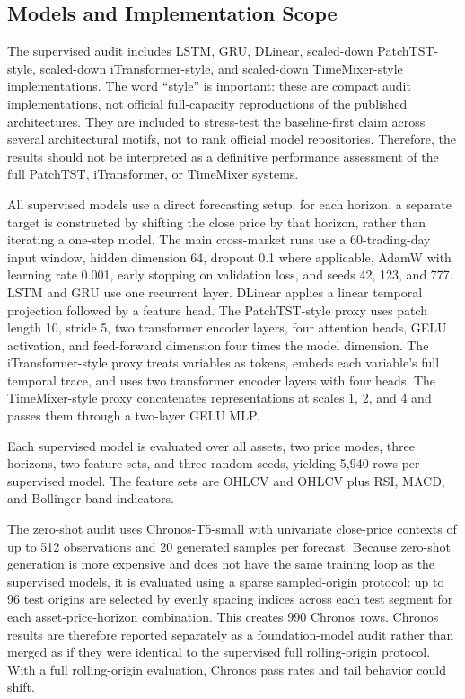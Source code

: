 \documentclass[11pt]{article}
\begin{document}
\subsection{Models and Implementation Scope}

The supervised audit includes LSTM, GRU, DLinear, scaled-down PatchTST-style, scaled-down iTransformer-style, and scaled-down TimeMixer-style implementations. The word ``style'' is important: these are compact audit implementations, not official full-capacity reproductions of the published architectures. They are included to stress-test the baseline-first claim across several architectural motifs, not to rank official model repositories. Therefore, the results should not be interpreted as a definitive performance assessment of the full PatchTST, iTransformer, or TimeMixer systems.

All supervised models use a direct forecasting setup: for each horizon, a separate target is constructed by shifting the close price by that horizon, rather than iterating a one-step model. The main cross-market runs use a 60-trading-day input window, hidden dimension 64, dropout 0.1 where applicable, AdamW with learning rate 0.001, early stopping on validation loss, and seeds 42, 123, and 777. LSTM and GRU use one recurrent layer. DLinear applies a linear temporal projection followed by a feature head. The PatchTST-style proxy uses patch length 10, stride 5, two transformer encoder layers, four attention heads, GELU activation, and feed-forward dimension four times the model dimension. The iTransformer-style proxy treats variables as tokens, embeds each variable's full temporal trace, and uses two transformer encoder layers with four heads. The TimeMixer-style proxy concatenates representations at scales 1, 2, and 4 and passes them through a two-layer GELU MLP.

Each supervised model is evaluated over all assets, two price modes, three horizons, two feature sets, and three random seeds, yielding 5,940 rows per supervised model. The feature sets are OHLCV and OHLCV plus RSI, MACD, and Bollinger-band indicators.

The zero-shot audit uses Chronos-T5-small with univariate close-price contexts of up to 512 observations and 20 generated samples per forecast. Because zero-shot generation is more expensive and does not have the same training loop as the supervised models, it is evaluated using a sparse sampled-origin protocol: up to 96 test origins are selected by evenly spacing indices across each test segment for each asset-price-horizon combination. This creates 990 Chronos rows. Chronos results are therefore reported separately as a foundation-model audit rather than merged as if they were identical to the supervised full rolling-origin protocol. With a full rolling-origin evaluation, Chronos pass rates and tail behavior could shift.
\end{document}
